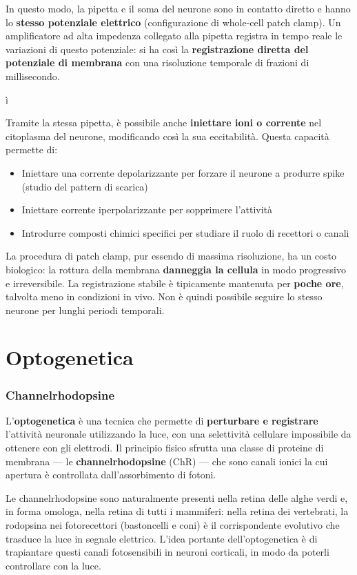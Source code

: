 In questo modo, la pipetta e il soma del neurone sono in contatto diretto e hanno lo \textbf{stesso potenziale elettrico} (configurazione di whole-cell patch clamp). Un amplificatore ad alta impedenza collegato alla pipetta registra in tempo reale le variazioni di questo potenziale: si ha così la \textbf{registrazione diretta del potenziale di membrana} con una risoluzione temporale di frazioni di millisecondo.

ì

Tramite la stessa pipetta, è possibile anche \textbf{iniettare ioni o corrente} nel citoplasma del neurone, modificando così la sua eccitabilità. Questa capacità permette di:

\begin{itemize}
    \item Iniettare una corrente depolarizzante per forzare il neurone a produrre spike (studio del pattern di scarica)
    \item Iniettare corrente iperpolarizzante per sopprimere l'attività
    \item Introdurre composti chimici specifici per studiare il ruolo di recettori o canali
\end{itemize}


La procedura di patch clamp, pur essendo di massima risoluzione, ha un costo biologico: la rottura della membrana \textbf{danneggia la cellula} in modo progressivo e irreversibile. La registrazione stabile è tipicamente mantenuta per \textbf{poche ore}, talvolta meno in condizioni in vivo. Non è quindi possibile seguire lo stesso neurone per lunghi periodi temporali.


\section{Optogenetica}

\subsubsection{Channelrhodopsine}

L'\textbf{optogenetica} è una tecnica che permette di \textbf{perturbare e registrare} l'attività neuronale utilizzando la luce, con una selettività cellulare impossibile da ottenere con gli elettrodi. Il principio fisico sfrutta una classe di proteine di membrana — le \textbf{channelrhodopsine} (ChR) — che sono canali ionici la cui apertura è controllata dall'assorbimento di fotoni.

Le channelrhodopsine sono naturalmente presenti nella retina delle alghe verdi e, in forma omologa, nella retina di tutti i mammiferi: nella retina dei vertebrati, la rodopsina nei fotorecettori (bastoncelli e coni) è il corrispondente evolutivo che trasduce la luce in segnale elettrico. L'idea portante dell'optogenetica è di trapiantare questi canali fotosensibili in neuroni corticali, in modo da poterli controllare con la luce.

